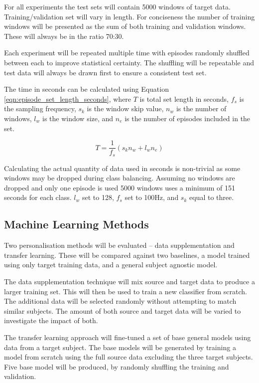 For all experiments the test sets will contain 5000 windows of target data. Training/validation set will vary in length. For conciseness the number of training windows will be presented as the sum of both training and validation windows. These will always be in the ratio 70:30. 

Each experiment will be repeated multiple time with episodes randomly shuffled between each to improve statistical certainty. The shuffling will be repeatable and test data will always be drawn first to ensure a consistent test set.

The time in seconds can be calculated using Equation \ref{eqn:episode_set_length_seconds}, where $T$ is total set length in seconds, $f_s$ is the sampling frequency, $s_k$ is the window skip value, $n_w$ is the number of windows, $l_w$ is the window size, and $n_e$ is the number of episodes included in the set.

\begin{equation}
    T = \frac{1}{f_s}(s_k n_w + l_w n_e)
    \label{eqn:episode_set_length_seconds}
\end{equation}

Calculating the actual quantity of data used in seconds is non-trivial as some windows may be dropped during class balancing. Assuming no windows are dropped and only one episode is used 5000 windows uses a minimum of 151 seconds for each class. $l_w$ set to 128, $f_s$ set to 100Hz, and $s_k$ equal to three.

\subsection{Machine Learning Methods}
Two personalisation methods will be evaluated -- data supplementation and transfer learning. These will be compared against two baselines, a model trained using only target training data, and a general subject agnostic model.

The data supplementation technique will mix source and target data to produce a larger training set. This will then be used to train a new classifier from scratch. The additional data will be selected randomly without attempting to match similar subjects. The amount of both source and target data will be varied to investigate the impact of both.

The transfer learning approach will fine-tuned a set of base general models using data from a target subject. The base models will be generated by training a model from scratch using the full source data excluding the three target subjects. Five base model will be produced, by randomly shuffling the training and validation.


